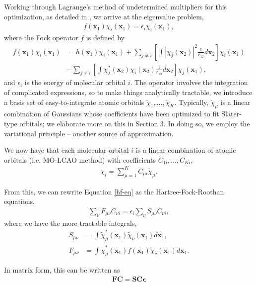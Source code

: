 \documentclass[12pt]{article}
\newcommand{\vect}[1]{\boldsymbol{#1}}
\begin{document}
Working through Lagrange's method of undetermined multipliers for this optimization, as detailed in \cite{sherrill2000introduction}, we arrive at the eigenvalue problem,
\begin{align}
f(\vect{x}_1)\chi_i (\vect{x}_1) = \epsilon_i \chi_i(\vect{x}_1) \label{hf-eq},
\end{align}
where the Fock operator $f$ is defined by 
\begin{align}
f(\vect{x}_1) \chi_i (\vect{x}_1) &= h(\vect{x}_1) \chi_i (\vect{x}_1) + \sum_{j \neq i} \left[ \int  | \chi_j(\vect{x}_2) |^2 \frac{1}{r_{12}} d \vect{x}_2 \right] \chi_i (\vect{x}_1) \nonumber \\
&- \sum_{j \neq i} \left[ \int  \chi_j^* (\vect{x}_2) \chi_i(\vect{x}_2) \frac{1}{r_{12}} d \vect{x}_2 \right] \chi_j (\vect{x}_1),
\end{align}
and $\epsilon_i$ is the energy of molecular orbital $i$.  The operator involves the integration of complicated expressions, so to make things analytically tractable, we introduce a basis set of easy-to-integrate atomic orbitals $\tilde{\chi}_1, \ldots, \tilde{\chi}_K$.  Typically, $\tilde{\chi}_\mu$ is a linear combination of Gaussians whose coefficients have been optimized to fit Slater-type orbitals; we elaborate more on this in Section 3.  In doing so, we employ the variational principle -- another source of approximation.  

We now have that each molecular orbital $i$ is a linear combination of atomic orbitals (i.e. MO-LCAO method) with coefficients $C_{1i}, \ldots, C_{Ki}$, 
\begin{align}
\chi_i = \sum_{\mu = 1}^K C_{\mu i} \tilde{\chi}_\mu. 
\end{align}    

From this, we can rewrite Equation \ref{hf-eq} as the Hartree-Fock-Roothan equations, 
\begin{align}
\sum_{\nu} F_{\mu \nu} C_{\nu i} = \epsilon_i \sum_{\nu} S_{\mu \nu} C_{\nu i},
\end{align}
where we have the more tractable integrals, 
\begin{align}
S_{\mu \nu} &= \int \tilde{\chi}_\mu^*(\vect{x}_1) \tilde{\chi}_\nu(\vect{x}_1) d \vect{x}_1 \label{overlap}, \\
F_{\mu \nu} &= \int \tilde{\chi}_\mu^*(\vect{x}_1) f(\vect{x}_1) \tilde{\chi}_\nu(\vect{x}_1) d \vect{x}_1 \label{fock}.
\end{align}

In matrix form, this can be written as 
\begin{align}
\vect{F} \vect{C} = \vect{S} \vect{C} \vect{\epsilon} \label{hfr}
\end{align}
\end{document}
